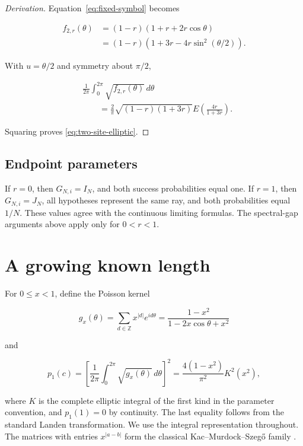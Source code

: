 \begin{proof}[Derivation]
Equation~\eqref{eq:fixed-symbol} becomes

\begin{align*}
f_{2,r}(\theta)
&=(1-r)(1+r+2r\cos\theta) \\
&=(1-r)(1+3r-4r\sin^2(\theta/2)).
\end{align*}

With \(u=\theta/2\) and symmetry about \(\pi/2\),

\begin{align*}
&\frac1{2\pi}\int_0^{2\pi}\sqrt{f_{2,r}(\theta)}\,d\theta \\
&\qquad=\frac2\pi\sqrt{(1-r)(1+3r)}
E\!\left(\frac{4r}{1+3r}\right).
\end{align*}

Squaring proves \eqref{eq:two-site-elliptic}.
\end{proof}

\subsection{Endpoint parameters}\label{endpoint-parameters}

If \(r=0\), then \(G_{N,i}=I_N\), and both success probabilities equal one.
If \(r=1\), then \(G_{N,i}=J_N\), all hypotheses represent the same ray, and
both probabilities equal \(1/N\). These values agree with the continuous
limiting formulas. The spectral-gap arguments above apply only for
\(0<r<1\).

\section{A growing known length}\label{a-growing-known-length}

For \(0\le x<1\), define the Poisson kernel

\[
g_x(\theta)=\sum_{d\in\mathbb Z}x^{|d|}e^{id\theta}
=\frac{1-x^2}{1-2x\cos\theta+x^2}
\]

and

\begin{equation}\label{eq:p1-definition}
p_1(c)=\left[\frac1{2\pi}\int_0^{2\pi}\sqrt{g_x(\theta)}\,d\theta\right]^2
=\frac{4(1-x^2)}{\pi^2}K^2(x^2),
\end{equation}

where \(K\) is the complete elliptic integral of the first kind in the
parameter convention, and \(p_1(1)=0\) by continuity. The last equality follows
from the standard Landen transformation. We use the integral representation
throughout. The matrices with entries \(x^{|a-b|}\) form the classical
Kac--Murdock--Szeg{\H o} family \cite{kac1953,gray2006}.

